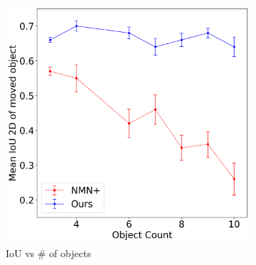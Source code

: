 \begin{figure}[h!]
\begin{subfigure}{0.5\hsize}
     \centering    
     \includegraphics[scale=0.19]{figures/multi-object-1.png}
    \caption{\footnotesize{IoU vs \# of objects}}
    \label{fig:large_scenes}
\end{subfigure}%
\begin{subfigure}{0.5\hsize}
     \centering    

\end{subfigure}
\end{figure}
